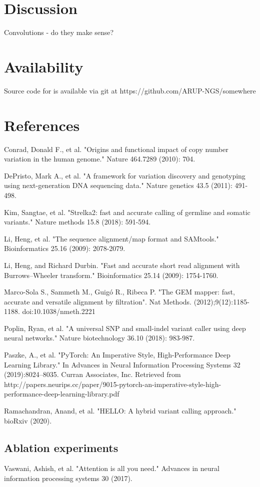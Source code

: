 \documentclass[]{article}
\begin{document}
 
 \section{Discussion}
 
 Convolutions - do they make sense? 
 
 \section{Availability}
 
 Source code for is available via git at https://github.com/ARUP-NGS/somewhere
 
 \section{References}
 
 \vspace{8pt}
 Conrad, Donald F., et al. "Origins and functional impact of copy number variation in the human genome." Nature 464.7289 (2010): 704.
 
\vspace{8pt}
DePristo, Mark A., et al. "A framework for variation discovery and genotyping using next-generation DNA sequencing data." Nature genetics 43.5 (2011): 491-498.


\vspace{8pt}
Kim, Sangtae, et al. "Strelka2: fast and accurate calling of germline and somatic variants." Nature methods 15.8 (2018): 591-594.

\vspace{8pt}
Li, Heng, et al. "The sequence alignment/map format and SAMtools." Bioinformatics 25.16 (2009): 2078-2079.

\vspace{8pt}
Li, Heng, and Richard Durbin. "Fast and accurate short read alignment with Burrows–Wheeler transform." Bioinformatics 25.14 (2009): 1754-1760.

\vspace{8pt}
Marco-Sola S., Sammeth M., Guigó R., Ribeca P. "The GEM mapper: fast, accurate and versatile alignment by filtration". Nat Methods. (2012);9(12):1185-1188. doi:10.1038/nmeth.2221

\vspace{8pt}
Poplin, Ryan, et al. "A universal SNP and small-indel variant caller using deep neural networks." Nature biotechnology 36.10 (2018): 983-987.
 
\vspace{8pt}
Paszke, A., et al. "PyTorch: An Imperative Style, High-Performance Deep Learning Library." In Advances in Neural Information Processing Systems 32 (2019):8024–8035. Curran Associates, Inc. Retrieved from http://papers.neurips.cc/paper/9015-pytorch-an-imperative-style-high-performance-deep-learning-library.pdf

\vspace{8pt}
Ramachandran, Anand, et al. "HELLO: A hybrid variant calling approach." bioRxiv (2020).
 

 \vspace{8pt}
 \subsection{Ablation experiments}
Vaswani, Ashish, et al. "Attention is all you need." Advances in neural information processing systems 30 (2017).
\end{document}
